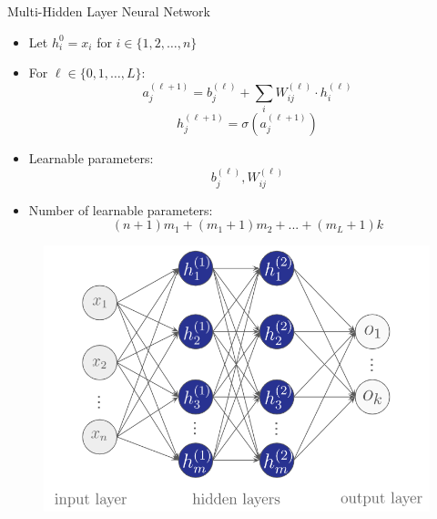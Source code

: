 \documentclass[serif, aspectratio=169]{beamer}
\begin{document}
\begin{frame}{Multi-Hidden Layer Neural Network}
    \begin{itemize}
        \item Let $h^0_i = x_i$ for $i \in \{1, 2, \ldots, n  \}$
        \item For $\ell \in \{0, 1, \ldots, L \}$:
        $$a^{(\ell+1)}_j = b^{(\ell)}_j + \sum_i W^{(\ell)}_{ij}\cdot h^{(\ell)}_i$$
        $$h^{(\ell+1)}_j = \sigma(a^{(\ell+1)}_j)$$

        \item Learnable parameters:
        $$b^{(\ell)}_j, W^{(\ell)}_{ij}$$

        \item Number of learnable parameters:
        $$(n+1)m_1 + (m_1 + 1)m_2 + ... + (m_L + 1)k$$
    \end{itemize}
    \endminipage
    \hfill
        \begin{figure}[bh]
            \includegraphics[width=\linewidth]{pic/2/multi-hidden-nn.png}
        \end{figure}
    \endminipage
\end{frame}
\end{document}
